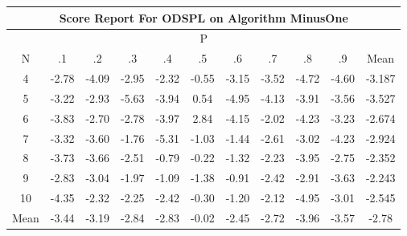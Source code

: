 \documentclass[11pt,a4paper]{report}
\begin{document}
\begin{longtable}{ | c || c | c | c | c | c | c | c | c | c || c |}
\hline
\multicolumn{11}{|c|}{ Score Report For ODSPL on Algorithm MinusOne} \\
\hline
\multicolumn{11}{|c|}{ P } \\
\hline
N & .1 & .2 & .3 & .4 & .5 & .6 & .7 & .8 & .9 & Mean\\
 \hline
 \hline
 \endhead
  4 &  \cellcolor[HTML]{FFB7B7} -2.78 &  \cellcolor[HTML]{FF9797} -4.09 &  \cellcolor[HTML]{FFB7B7} -2.95 &  \cellcolor[HTML]{FFC7C7} -2.32 &  \cellcolor[HTML]{FFEFEF} -0.55 &  \cellcolor[HTML]{FFAFAF} -3.15 &  \cellcolor[HTML]{FFA7A7} -3.52 &  \cellcolor[HTML]{FF8787} -4.72 &  \cellcolor[HTML]{FF8F8F} -4.60 & -3.187 \\
  5 &  \cellcolor[HTML]{FFAFAF} -3.22 &  \cellcolor[HTML]{FFB7B7} -2.93 &  \cellcolor[HTML]{FF7070} -5.63 &  \cellcolor[HTML]{FF9F9F} -3.94 &  \cellcolor[HTML]{EFEFFF} 0.54 &  \cellcolor[HTML]{FF8080} -4.95 &  \cellcolor[HTML]{FF9797} -4.13 &  \cellcolor[HTML]{FF9F9F} -3.91 &  \cellcolor[HTML]{FFA7A7} -3.56 & -3.527 \\
  6 &  \cellcolor[HTML]{FF9F9F} -3.83 &  \cellcolor[HTML]{FFB7B7} -2.70 &  \cellcolor[HTML]{FFB7B7} -2.78 &  \cellcolor[HTML]{FF9F9F} -3.97 &  \cellcolor[HTML]{B7B7FF} 2.84 &  \cellcolor[HTML]{FF9797} -4.15 &  \cellcolor[HTML]{FFCFCF} -2.02 &  \cellcolor[HTML]{FF9797} -4.23 &  \cellcolor[HTML]{FFAFAF} -3.23 & -2.674 \\
  7 &  \cellcolor[HTML]{FFAFAF} -3.32 &  \cellcolor[HTML]{FFA7A7} -3.60 &  \cellcolor[HTML]{FFCFCF} -1.76 &  \cellcolor[HTML]{FF7878} -5.31 &  \cellcolor[HTML]{FFE7E7} -1.03 &  \cellcolor[HTML]{FFD7D7} -1.44 &  \cellcolor[HTML]{FFBFBF} -2.61 &  \cellcolor[HTML]{FFAFAF} -3.02 &  \cellcolor[HTML]{FF9797} -4.23 & -2.924 \\
  8 &  \cellcolor[HTML]{FF9F9F} -3.73 &  \cellcolor[HTML]{FF9F9F} -3.66 &  \cellcolor[HTML]{FFBFBF} -2.51 &  \cellcolor[HTML]{FFEFEF} -0.79 &  \cellcolor[HTML]{FFF7F7} -0.22 &  \cellcolor[HTML]{FFDFDF} -1.32 &  \cellcolor[HTML]{FFC7C7} -2.23 &  \cellcolor[HTML]{FF9F9F} -3.95 &  \cellcolor[HTML]{FFB7B7} -2.75 & -2.352 \\
  9 &  \cellcolor[HTML]{FFB7B7} -2.83 &  \cellcolor[HTML]{FFAFAF} -3.04 &  \cellcolor[HTML]{FFCFCF} -1.97 &  \cellcolor[HTML]{FFE7E7} -1.09 &  \cellcolor[HTML]{FFDFDF} -1.38 &  \cellcolor[HTML]{FFE7E7} -0.91 &  \cellcolor[HTML]{FFBFBF} -2.42 &  \cellcolor[HTML]{FFB7B7} -2.91 &  \cellcolor[HTML]{FFA7A7} -3.63 & -2.243 \\
  10 &  \cellcolor[HTML]{FF8F8F} -4.35 &  \cellcolor[HTML]{FFC7C7} -2.32 &  \cellcolor[HTML]{FFC7C7} -2.25 &  \cellcolor[HTML]{FFBFBF} -2.42 &  \cellcolor[HTML]{FFF7F7} -0.30 &  \cellcolor[HTML]{FFDFDF} -1.20 &  \cellcolor[HTML]{FFC7C7} -2.12 &  \cellcolor[HTML]{FF8080} -4.95 &  \cellcolor[HTML]{FFB7B7} -3.01 & -2.545 \\
 \hline
 \hline
Mean &  \cellcolor[HTML]{FFA7A7} -3.44 &  \cellcolor[HTML]{FFAFAF} -3.19 &  \cellcolor[HTML]{FFB7B7} -2.84 &  \cellcolor[HTML]{FFB7B7} -2.83 &  \cellcolor[HTML]{FFFFFF} -0.02 &  \cellcolor[HTML]{FFBFBF} -2.45 &  \cellcolor[HTML]{FFB7B7} -2.72 &  \cellcolor[HTML]{FF9F9F} -3.96 &  \cellcolor[HTML]{FFA7A7} -3.57 &  \cellcolor[HTML]{FFB7B7} -2.78
\end{longtable}
\end{document}
